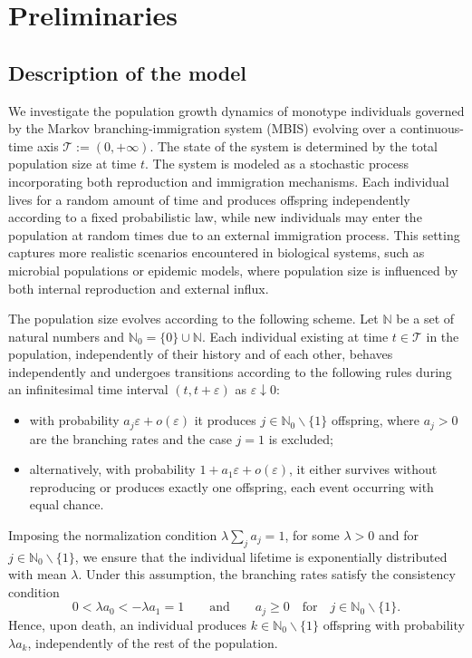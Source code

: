 \documentclass[10pt,reqno]{amsart}
\theoremstyle{definition}
\numberwithin{equation}{section}
\begin{document}
\section{\textbf{Preliminaries}}             \label{IIBSec2}

\subsection{\textbf{Description of the model}}             \label{IIBSubsec2.1}

    We investigate the population growth dynamics of monotype individuals governed by the Markov branching-immigration
    system (MBIS) evolving over a continuous-time axis $\mathcal{T}:=(0,+\infty)$. The state of the system is determined
    by the total population size at time $t$. The system is modeled as a stochastic process incorporating both reproduction
    and immigration mechanisms. Each individual lives for a random amount of time and produces offspring independently
    according to a fixed probabilistic law, while new individuals may enter the population at random times due to
    an external immigration process. This setting captures more realistic scenarios encountered in biological
    systems, such as microbial populations or epidemic models, where population size is influenced by both
    internal reproduction and external influx.

    The population size evolves according to the following scheme. Let ${\mathbb{N}}$ be a set of natural numbers
    and ${\mathbb{N}}_0=\{0\}\cup{\mathbb{N}}$. Each individual existing at time $t\in{\mathcal{T}}$ in the population,
    independently of their history and of each other, behaves independently and undergoes transitions according to
    the following rules during an infinitesimal time interval $(t, t+\varepsilon)$ as $\varepsilon\downarrow{0}$:
\begin{itemize}
\item with probability $a_j\varepsilon+o(\varepsilon)$ it produces $j\in{\mathbb{N}}_0\backslash\{1\}$ offspring,
        where $a_j>0$ are the branching rates and the case $j=1$ is excluded;

\item alternatively, with probability $1+a_1\varepsilon+o(\varepsilon)$, it either survives without reproducing
        or produces exactly one offspring, each event occurring with equal chance.
\end{itemize}
    Imposing the normalization condition $\lambda\sum_{j}{a_j}=1$, for some $\lambda>0$
    and for $j\in{\mathbb{N}}_0\backslash \{1\}$, we ensure that the individual lifetime is exponentially distributed
    with mean $\lambda$. Under this assumption, the branching rates satisfy the consistency condition
\[
    0<\lambda{a_0}<-\lambda{a_1}=1  \qquad {\text{and}} \qquad a_j\ge 0 \quad
    {\text{for}} \quad {j\in{\mathbb{N}}_0 \backslash \{1\}}.
\]
    Hence, upon death, an individual produces $k\in{\mathbb{N}}_0 \backslash \{1\}$ offspring
    with probability $\lambda{a_k}$, independently of the rest of the population.
\end{document}
